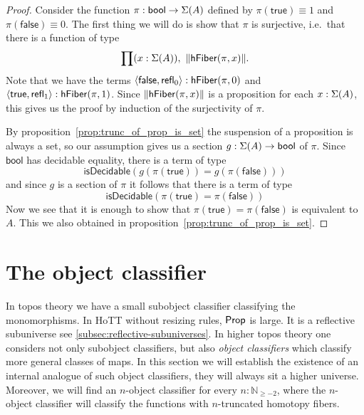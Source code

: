 \begin{proof}
Consider the function $\pi:\mathsf{bool}\to\Sigma(A)$ defined by 
$\pi(\mathsf{true})\equiv 1$ and $\pi(\mathsf{false})\equiv 0$. 
The first thing we will do is show that $\pi$ is surjective, 
i.e.\ that there is a function of type
\begin{equation*}
\prod(x:\Sigma(A)),\ \|\mathsf{hFiber}(\pi,x)\|.
\end{equation*}
Note that we have the terms 
$\langle{\mathsf{false},\ensuremath{\mathsf{refl}_{0}}}\rangle:\mathsf{hFiber}(\pi,0)$ 
and $\langle{\mathsf{true},\ensuremath{\mathsf{refl}_{1}}}\rangle:\mathsf{hFiber}(\pi,1)$. 
Since $\|\mathsf{hFiber}(\pi,x)\|$ is a proposition for each 
$x:\Sigma(A)$, this gives us the proof by induction of 
the surjectivity of $\pi$.

By proposition~\ref{prop:trunc_of_prop_is_set} the suspension of 
a proposition is always a set, so our assumption gives us a 
section $g:\Sigma(A)\to\mathsf{bool}$ of $\pi$. 
Since $\mathsf{bool}$ has decidable equality, there is a term of type 
\begin{equation*}
\mathsf{isDecidable}(g(\pi(\mathsf{true}))= g(\pi(\mathsf{false})))
\end{equation*}
and since $g$ is a section of $\pi$ it follows that there is a term of type
\begin{equation*}
\mathsf{isDecidable}(\pi(\mathsf{true})=\pi(\mathsf{false}))
\end{equation*}
Now we see that it is enough to show that 
$\pi(\mathsf{true})= \pi(\mathsf{false})$ is equivalent to $A$. 
This we also obtained in proposition~\ref{prop:trunc_of_prop_is_set}.
\end{proof}

\section{The object classifier}\label{sec:object_classification}
In topos theory we have a small subobject classifier classifying the monomorphisms.
In HoTT without resizing rules, $\mathsf{Prop}$ is large. It is a reflective subuniverse see \autoref{subsec:reflective-subuniverses}.
In higher topos theory one considers not only subobject classifiers, but also \emph{object classifiers} 
which classify more general classes of maps.
In this section we will establish the existence of an internal analogue of such object classifiers, 
they will always sit a higher universe. Moreover, we will find an $n$-object classifier for
every $n:\mathbb{N}_{\geq-2}$, where the $n$-object classifier will classify the
functions with $n$-truncated homotopy fibers. 

